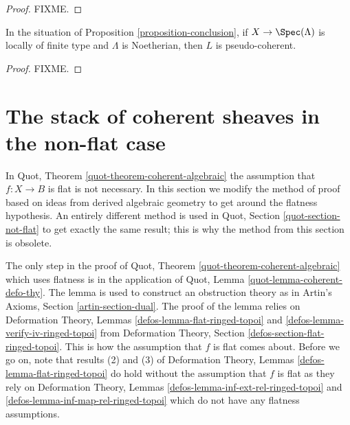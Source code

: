 \begin{proof}
FIXME.
\end{proof}

\begin{lemma}
\label{lemma-pseudo-coherent}
In the situation of Proposition \ref{proposition-conclusion}, if
$X \to \Spec(\Lambda)$ is locally of finite type and $\Lambda$ is Noetherian,
then $L$ is pseudo-coherent.
\end{lemma}

\begin{proof}
FIXME.
\end{proof}






\section{The stack of coherent sheaves in the non-flat case}
\label{section-not-flat}

\noindent
In Quot, Theorem \ref{quot-theorem-coherent-algebraic}
the assumption that $f : X \to B$ is flat is not necessary.
In this section we modify the method of proof based on ideas from
derived algebraic geometry to get around the flatness hypothesis.
An entirely different method is used in
Quot, Section \ref{quot-section-not-flat}
to get exactly the same result; this is why the
method from this section is obsolete.

\medskip\noindent
The only step in the proof of
Quot, Theorem \ref{quot-theorem-coherent-algebraic}
which uses flatness is in the application of
Quot, Lemma \ref{quot-lemma-coherent-defo-thy}.
The lemma is used to construct an obstruction theory as in
Artin's Axioms, Section \ref{artin-section-dual}.
The proof of the lemma relies on
Deformation Theory, Lemmas \ref{defos-lemma-flat-ringed-topoi} and
\ref{defos-lemma-verify-iv-ringed-topoi} from
Deformation Theory, Section \ref{defos-section-flat-ringed-topoi}.
This is how the assumption that $f$ is flat comes about.
Before we go on, note that results (2) and (3) of
Deformation Theory, Lemmas \ref{defos-lemma-flat-ringed-topoi}
do hold without the assumption that $f$ is flat as they rely
on Deformation Theory, Lemmas \ref{defos-lemma-inf-ext-rel-ringed-topoi}
and \ref{defos-lemma-inf-map-rel-ringed-topoi}
which do not have any flatness assumptions.

